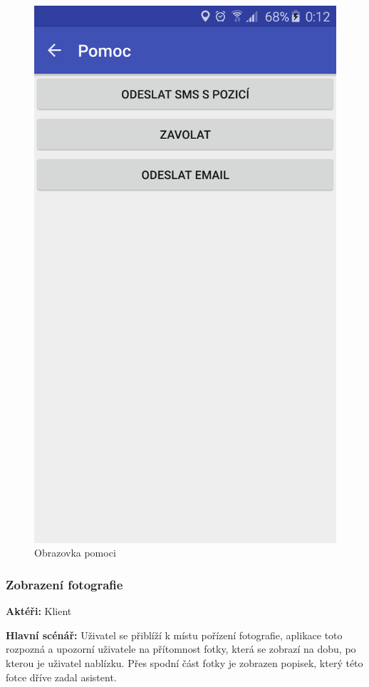 \documentclass{article}
\newcommand{\usecase}[2]{\subsubsection{#1}\label{#2}}
\begin{document}
\begin{figure}[H]
\begin{minipage}{.5\textwidth}
                \includegraphics[scale=0.14]{img/screen/volanipomoc.jpg}
        \caption{Obrazovka pomoci}
        \label{fig:pomoc}
    \end{minipage}
\end{figure}



\usecase{Zobrazení fotografie}{zobrazenifotky}
\textbf{Aktéři:} Klient

\vspace{0.1cm}
\noindent
\textbf{Hlavní scénář:} Uživatel se přiblíží k místu pořízení fotografie, aplikace toto rozpozná
a upozorní uživatele na přítomnost fotky, která se zobrazí na dobu, po kterou je uživatel nablízku.
Přes spodní část fotky je zobrazen popisek, který této fotce dříve zadal asistent.
\end{document}
